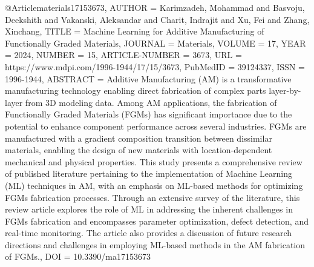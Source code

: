 
@Article{materials17153673,
AUTHOR = {Karimzadeh, Mohammad and Basvoju, Deekshith and Vakanski, Aleksandar and Charit, Indrajit and Xu, Fei and Zhang, Xinchang},
TITLE = {Machine Learning for Additive Manufacturing of Functionally Graded Materials},
JOURNAL = {Materials},
VOLUME = {17},
YEAR = {2024},
NUMBER = {15},
ARTICLE-NUMBER = {3673},
URL = {https://www.mdpi.com/1996-1944/17/15/3673},
PubMedID = {39124337},
ISSN = {1996-1944},
ABSTRACT = {Additive Manufacturing (AM) is a transformative manufacturing technology enabling direct fabrication of complex parts layer-by-layer from 3D modeling data. Among AM applications, the fabrication of Functionally Graded Materials (FGMs) has significant importance due to the potential to enhance component performance across several industries. FGMs are manufactured with a gradient composition transition between dissimilar materials, enabling the design of new materials with location-dependent mechanical and physical properties. This study presents a comprehensive review of published literature pertaining to the implementation of Machine Learning (ML) techniques in AM, with an emphasis on ML-based methods for optimizing FGMs fabrication processes. Through an extensive survey of the literature, this review article explores the role of ML in addressing the inherent challenges in FGMs fabrication and encompasses parameter optimization, defect detection, and real-time monitoring. The article also provides a discussion of future research directions and challenges in employing ML-based methods in the AM fabrication of FGMs.},
DOI = {10.3390/ma17153673}
}